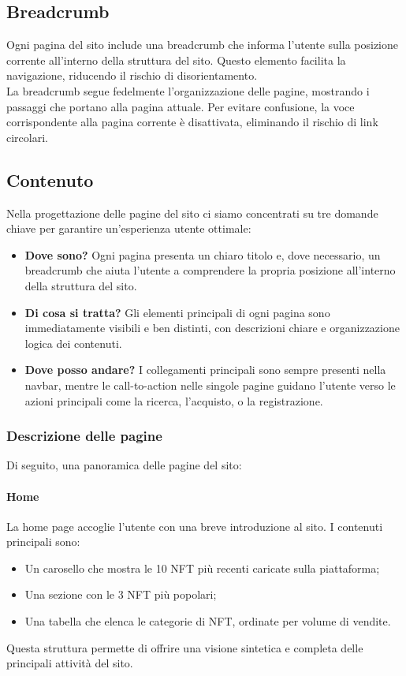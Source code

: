 \documentclass[10pt]{article}
\begin{document}
\subsection{Breadcrumb}
Ogni pagina del sito include una breadcrumb che informa l'utente sulla posizione corrente all'interno della struttura del sito. Questo elemento facilita la navigazione, riducendo il rischio di disorientamento.\\
La breadcrumb segue fedelmente l’organizzazione delle pagine, mostrando i passaggi che portano alla pagina attuale. Per evitare confusione, la voce corrispondente alla pagina corrente è disattivata, eliminando il rischio di link circolari.

\subsection{Contenuto} Nella progettazione delle pagine del sito ci siamo concentrati su tre domande chiave per garantire un’esperienza utente ottimale: \begin{itemize} \item \textbf{Dove sono?} Ogni pagina presenta un chiaro titolo e, dove necessario, un breadcrumb che aiuta l’utente a comprendere la propria posizione all’interno della struttura del sito. \item \textbf{Di cosa si tratta?} Gli elementi principali di ogni pagina sono immediatamente visibili e ben distinti, con descrizioni chiare e organizzazione logica dei contenuti. \item \textbf{Dove posso andare?} I collegamenti principali sono sempre presenti nella navbar, mentre le call-to-action nelle singole pagine guidano l’utente verso le azioni principali come la ricerca, l’acquisto, o la registrazione. \end{itemize}

\subsubsection{Descrizione delle pagine} Di seguito, una panoramica delle pagine del sito:

\paragraph{Home} La home page accoglie l’utente con una breve introduzione al sito. I contenuti principali sono: \begin{itemize} \item Un carosello che mostra le 10 NFT più recenti caricate sulla piattaforma; \item Una sezione con le 3 NFT più popolari; \item Una tabella che elenca le categorie di NFT, ordinate per volume di vendite. \end{itemize} Questa struttura permette di offrire una visione sintetica e completa delle principali attività del sito.
\end{document}
